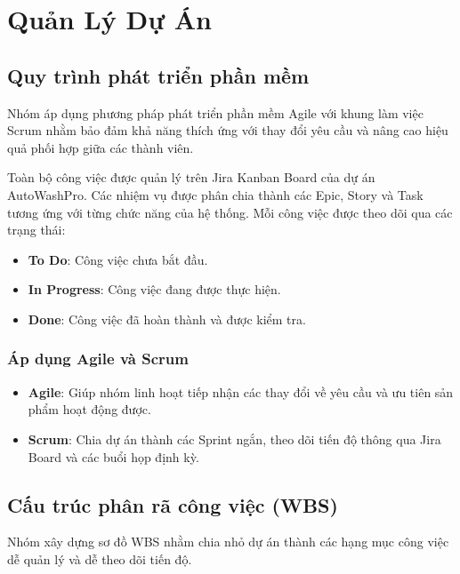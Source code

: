 \chapter{Quản Lý Dự Án}

\section{Quy trình phát triển phần mềm}

Nhóm áp dụng phương pháp phát triển phần mềm Agile với khung làm việc Scrum nhằm bảo đảm khả năng thích ứng với thay đổi yêu cầu và nâng cao hiệu quả phối hợp giữa các thành viên.

Toàn bộ công việc được quản lý trên Jira Kanban Board của dự án AutoWashPro. Các nhiệm vụ được phân chia thành các Epic, Story và Task tương ứng với từng chức năng của hệ thống. Mỗi công việc được theo dõi qua các trạng thái:

\begin{itemize}
    \item \textbf{To Do}: Công việc chưa bắt đầu.
    \item \textbf{In Progress}: Công việc đang được thực hiện.
    \item \textbf{Done}: Công việc đã hoàn thành và được kiểm tra.
\end{itemize}

\subsection{Áp dụng Agile và Scrum}

\begin{itemize}
    \item \textbf{Agile}: Giúp nhóm linh hoạt tiếp nhận các thay đổi về yêu cầu và ưu tiên sản phẩm hoạt động được.
    
    \item \textbf{Scrum}: Chia dự án thành các Sprint ngắn, theo dõi tiến độ thông qua Jira Board và các buổi họp định kỳ.
\end{itemize}


\section{Cấu trúc phân rã công việc (WBS)}

Nhóm xây dựng sơ đồ WBS nhằm chia nhỏ dự án thành các hạng mục công việc dễ quản lý và dễ theo dõi tiến độ.

